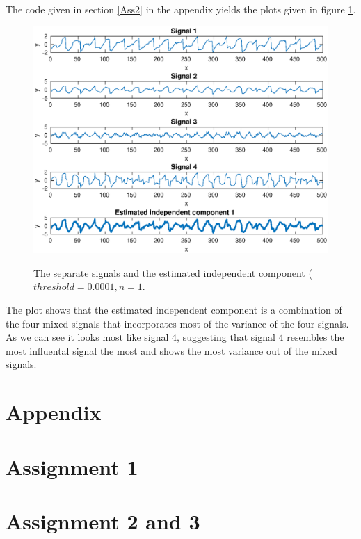 \documentclass[10pt]{article}
\begin{document}
\subsection{}
The code given in section \ref{Ass2} in the appendix yields the plots given in figure \ref{fig2.1}.
\begin{figure}
  \centering
  \caption{The separate signals and the estimated independent component ($threshold = 0.0001, n = 1$.}
    \includegraphics[width=\columnwidth]{Ass2.eps}
  \label{fig2.1}
\end{figure}
The plot shows that the estimated independent component is a combination of the four mixed signals that incorporates most of the variance of the four signals. As we can see it looks most like signal 4, suggesting that signal 4 resembles the most influental signal the most and shows the most variance out of the mixed signals.

\section{}

\newpage
\section*{Appendix}
\appendix
\section{Assignment 1}
{\label{Ass1}}
\section{Assignment 2 and 3}
{\label{Ass2}}
\end{document}
